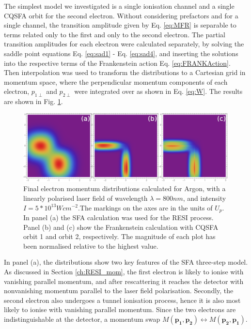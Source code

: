 \documentclass[11pt]{article}
\numberwithin{equation}{section}
\begin{document}
The simplest model we investigated is a single ionisation channel and a single CQSFA orbit for the second electron. Without considering prefactors and for a single channel, the transition amplitude given by Eq. \ref{eq:MFR} is separable to terms related only to the first and only to the second electron. The partial transition amplitudes for each electron were calculated separately, by solving the saddle point equations Eq. \ref{eq:sad1} - Eq. \ref{eq:sad4}, and inserting the solutions into the respective terms of the Frankenstein action Eq. \ref{eq:FRANKAction}. Then interpolation was used to transform the distributions to a Cartesian grid in momentum space, where the perpendicular momentum components of each electron, $p_{1\perp}$ and $p_{2\perp}$ were integrated over as shown in Eq. \ref{eq:W}. The results are shown in Fig. \ref{fig:single_orbit_5e13}.
\begin{figure} [!htb]
    \centering
    \includegraphics[width = 14cm]{Figures/combined_800_5e13.png}
    \caption{Final electron momentum distributions calculated for Argon, with a linearly polarised laser field of wavelength $\lambda = 800nm$, and intensity $I = 5*10^{13} Wcm^{-2}$.The markings on the axes are in the units of $U_p$. In panel (a) the SFA calculation was used for the RESI process. Panel (b) and (c) show the Frankenstein calculation with CQSFA orbit 1 and orbit 2, respectively. The magnitude of each plot has been normalised relative to the highest value.}
    \label{fig:single_orbit_5e13}
\end{figure}
\newline
In panel (a), the distributions show two key features of the SFA three-step model. As discussed in Section \ref{ch:RESI_mom}, the first electron is likely to ionise with vanishing parallel momentum, and after rescattering it reaches the detector with nonvanishing momentum parallel to the laser field polarisation. Secondly, the second electron also undergoes a tunnel ionisation process, hence it is also most likely to ionise with vanishing parallel momentum. Since the two electrons are indistinguishable at the detector, a momentum swap $M(\mathbf{p_1}, \mathbf{p_2}) \leftrightarrow M(\mathbf{p_2}, \mathbf{p_1})$. 
\end{document}
